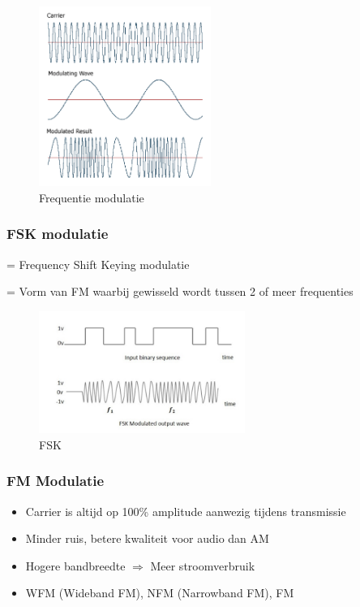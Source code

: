 \documentclass{article}
\begin{document}
\begin{figure}[H]
    \centering
    \includegraphics[width=0.5\textwidth]{Screenshot_20200302_121335.png}
    \caption{Frequentie modulatie}
\end{figure}

\subsubsection{FSK modulatie}
= Frequency Shift Keying modulatie

= Vorm van FM waarbij gewisseld wordt tussen 2 of meer frequenties

\begin{figure}[H]
    \centering
    \includegraphics[width=0.6\textwidth]{Screenshot_20200302_121458.png}
    \caption{FSK}
\end{figure}

\subsubsection{FM Modulatie}
\begin{itemize}
    \item Carrier is altijd op 100\% amplitude aanwezig tijdens transmissie
    \item Minder ruis, betere kwaliteit voor audio dan AM
    \item Hogere bandbreedte $\Rightarrow$ Meer stroomverbruik
    \item WFM (Wideband FM), NFM (Narrowband FM), FM
\end{itemize}
\end{document}
